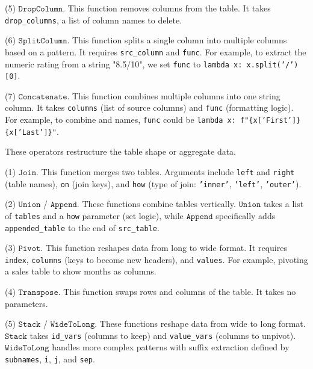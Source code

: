 (5) $\mathtt{DropColumn}$.
    This function removes columns from the table. It takes {\small\texttt{drop\_columns}}, a list of column names to delete.

(6) $\mathtt{SplitColumn}$.
    This function splits a single column into multiple columns based on a pattern. It requires {\small\texttt{src\_column}} and {\small\texttt{func}}. For example, to extract the numeric rating from a string "8.5/10", we set {\small\texttt{func}} to {\small\texttt{lambda x: x.split('/')[0]}}.

(7) $\mathtt{Concatenate}$.
    This function combines multiple columns into one string column. It takes {\small\texttt{columns}} (list of source columns) and {\small\texttt{func}} (formatting logic). For example, to combine  and  names, {\small\texttt{func}} could be {\small\texttt{lambda x: f"\{x['First']\} \{x['Last']\}"}}.

These operators restructure the table shape or aggregate data.

(1) $\mathtt{Join}$.
    This function merges two tables. Arguments include {\small\texttt{left}} and {\small\texttt{right}} (table names), {\small\texttt{on}} (join keys), and {\small\texttt{how}} (type of join: {\small\texttt{'inner'}}, {\small\texttt{'left'}}, {\small\texttt{'outer'}}).

(2) $\mathtt{Union}$ / $\mathtt{Append}$.
    These functions combine tables vertically. $\mathtt{Union}$ takes a list of {\small\texttt{tables}} and a {\small\texttt{how}} parameter (\eg set logic), while $\mathtt{Append}$ specifically adds {\small\texttt{appended\_table}} to the end of {\small\texttt{src\_table}}.

(3) $\mathtt{Pivot}$.
    This function reshapes data from long to wide format. It requires {\small\texttt{index}}, {\small\texttt{columns}} (keys to become new headers), and {\small\texttt{values}}. For example, pivoting a sales table to show months as columns.

(4) $\mathtt{Transpose}$.
    This function swaps rows and columns of the table. It takes no parameters.

(5) $\mathtt{Stack}$ / $\mathtt{WideToLong}$.
    These functions reshape data from wide to long format. $\mathtt{Stack}$ takes {\small\texttt{id\_vars}} (columns to keep) and {\small\texttt{value\_vars}} (columns to unpivot). $\mathtt{WideToLong}$ handles more complex patterns with suffix extraction defined by {\small\texttt{subnames}}, {\small\texttt{i}}, {\small\texttt{j}}, and {\small\texttt{sep}}.

